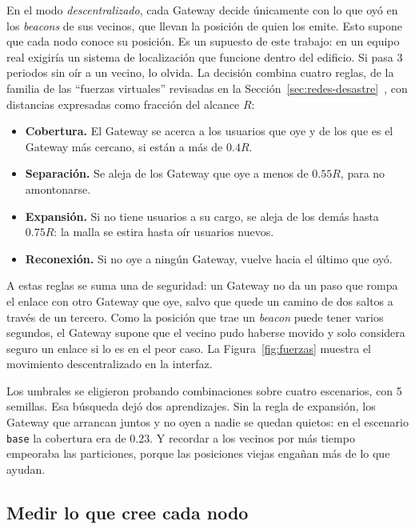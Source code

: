 En el modo \textit{descentralizado}, cada Gateway decide únicamente con lo que
oyó en los \textit{beacons} de sus vecinos, que llevan la posición de quien los
emite. Esto supone que cada nodo conoce su posición. Es un supuesto de este
trabajo: en un equipo real exigiría un sistema de localización que funcione
dentro del edificio. Si pasa 3 periodos sin oír a un
vecino, lo olvida. La decisión combina cuatro reglas, de la familia de las
``fuerzas virtuales'' revisadas en la
Sección~\ref{sec:redes-desastre}~\cite{Howard2002PotentialFields,Zou2003VirtualForces,Poduri2004ConstrainedCoverage},
con distancias expresadas como fracción del alcance $R$:

\begin{itemize}
\item \textbf{Cobertura.} El Gateway se acerca a los usuarios que oye y de los
que es el Gateway más cercano, si están a más de $0.4R$.
\item \textbf{Separación.} Se aleja de los Gateway que oye a menos de $0.55R$,
para no amontonarse.
\item \textbf{Expansión.} Si no tiene usuarios a su cargo, se aleja de los demás
hasta $0.75R$: la malla se estira hasta oír usuarios nuevos.
\item \textbf{Reconexión.} Si no oye a ningún Gateway, vuelve hacia el último
que oyó.
\end{itemize}

A estas reglas se suma una de seguridad: un Gateway no da un paso que rompa el
enlace con otro Gateway que oye, salvo que quede un camino de dos saltos a
través de un tercero. Como la posición que trae un \textit{beacon} puede tener
varios segundos, el Gateway supone que el vecino pudo haberse movido y solo
considera seguro un enlace si lo es en el peor caso. La
Figura~\ref{fig:fuerzas} muestra el movimiento descentralizado en la interfaz.

Los umbrales se eligieron probando combinaciones sobre cuatro escenarios, con 5
semillas. Esa búsqueda dejó dos aprendizajes. Sin la regla de expansión, los
Gateway que arrancan juntos y no oyen a nadie se quedan quietos: en el escenario
\texttt{base} la cobertura era de 0.23. Y recordar a los vecinos por más tiempo
empeoraba las particiones, porque las posiciones viejas engañan más de lo que
ayudan.

\subsection{Medir lo que cree cada nodo}
\label{sec:metricas-descentralizacion}

